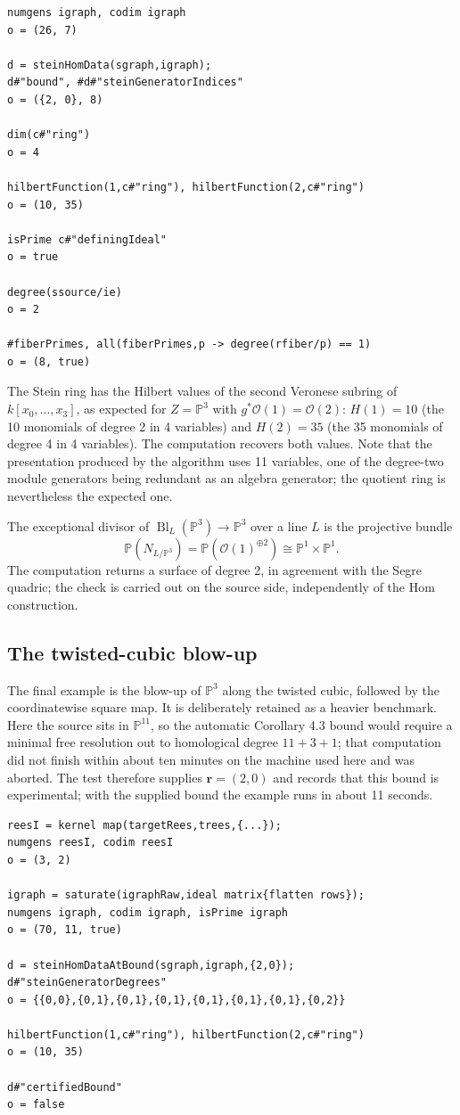 \documentclass[11pt,reqno]{amsart}
\newcommand{\PP}{\ensuremath{\mathbb{P}}}
\newcommand{\sO}{\ensuremath{\mathcal{O}}}
\DeclareMathOperator{\Bl}{Bl}
\theoremstyle{plain}
\theoremstyle{definition}
\begin{document}
\begin{verbatim}
numgens igraph, codim igraph
o = (26, 7)

d = steinHomData(sgraph,igraph);
d#"bound", #d#"steinGeneratorIndices"
o = ({2, 0}, 8)

dim(c#"ring")
o = 4

hilbertFunction(1,c#"ring"), hilbertFunction(2,c#"ring")
o = (10, 35)

isPrime c#"definingIdeal"
o = true

degree(ssource/ie)
o = 2

#fiberPrimes, all(fiberPrimes,p -> degree(rfiber/p) == 1)
o = (8, true)
\end{verbatim}

The Stein ring has the Hilbert values of the second Veronese subring of
\(k[x_0,\dots,x_3]\), as expected for \(Z=\PP^3\) with \(g^*\sO(1)=\sO(2)\): \(H(1)=10\)
(the 10 monomials of degree 2 in 4 variables) and \(H(2)=35\) (the 35
monomials of degree 4 in 4 variables). The computation recovers both
values. Note that the presentation produced by the algorithm uses 11
variables, one of the degree-two module generators being redundant as an
algebra generator; the quotient ring is nevertheless the expected one.

The exceptional divisor of \(\Bl_L(\PP^3) \to \PP^3\) over a line
\(L\) is the projective bundle
\[\PP(N_{L/\PP^3}) = \PP(\sO(1)^{\oplus 2}) \cong \PP^1 \times \PP^1.\]
The computation returns a surface of degree 2, in agreement with the
Segre quadric; the check is carried out on the source side,
independently of the Hom construction.

\subsection{The twisted-cubic blow-up}\label{sec:twisted-cubic}

The final example is the blow-up of \(\PP^3\) along the twisted cubic,
followed by the coordinatewise square map. It is deliberately retained
as a heavier benchmark. Here the source sits in \(\PP^{11}\), so the
automatic Corollary 4.3 bound would require a minimal free resolution
out to homological degree \(11+3+1\); that computation did not finish
within about ten minutes on the machine used here and was aborted. The
test therefore supplies \(\mathbf{r}=(2,0)\) and records that this bound is
experimental; with the supplied bound the example runs in about 11
seconds.

\begin{verbatim}
reesI = kernel map(targetRees,trees,{...});
numgens reesI, codim reesI
o = (3, 2)

igraph = saturate(igraphRaw,ideal matrix{flatten rows});
numgens igraph, codim igraph, isPrime igraph
o = (70, 11, true)

d = steinHomDataAtBound(sgraph,igraph,{2,0});
d#"steinGeneratorDegrees"
o = {{0,0},{0,1},{0,1},{0,1},{0,1},{0,1},{0,1},{0,2}}

hilbertFunction(1,c#"ring"), hilbertFunction(2,c#"ring")
o = (10, 35)

d#"certifiedBound"
o = false
\end{verbatim}
\end{document}
